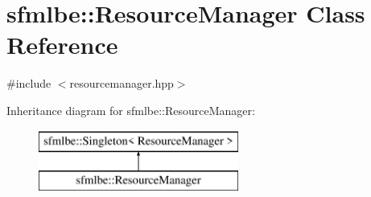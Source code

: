 \hypertarget{classsfmlbe_1_1_resource_manager}{}\section{sfmlbe\+:\+:Resource\+Manager Class Reference}
\label{classsfmlbe_1_1_resource_manager}


{\ttfamily \#include $<$resourcemanager.\+hpp$>$}

Inheritance diagram for sfmlbe\+:\+:Resource\+Manager\+:\begin{figure}[H]
\begin{center}
\leavevmode
\includegraphics[height=2.000000cm]{classsfmlbe_1_1_resource_manager}
\end{center}
\end{figure}
